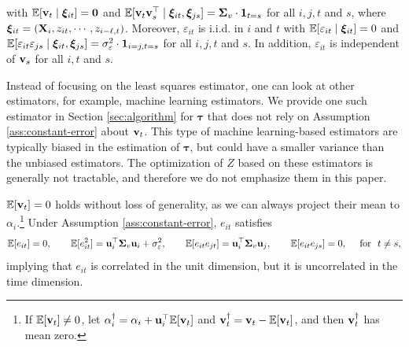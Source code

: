 	
	\begin{assumption}\label{ass:constant-error}
 with  $\mathbb{E}[\mathbf{v}_t  \mid \bm{\xi}_{it}] = \bm{0}$ and $\mathbb{E}[\mathbf{v}_t \mathbf{v}_s^\top \mid \bm{\xi}_{it}, \bm{\xi}_{js} ] = \bm\Sigma_{v} \cdot \bm{1}_{t = s}$ for all $i, j, t$ and $s$, where $\bm{\xi}_{it} = (\mathbf{X}_i, z_{it}, \cdots, z_{i-\ell, t})$. Moreover, $\varepsilon_{it} $ is i.i.d. in $i$ and $t$ with $\mathbb{E}[\varepsilon_{it} \mid \bm{\xi}_{it}] =0$ and $\mathbb{E}[\varepsilon_{it} \varepsilon_{js}  \mid \bm{\xi}_{it}, \bm{\xi}_{js} ] = \sigma_\varepsilon^2 \cdot \bm{1}_{i = j, t = s}$ for all $i, j, t$ and $s$. In addition, $\varepsilon_{it}$ is independent of $\mathbf{v}_s$  for all $i, t$ and $s$.
	\end{assumption}

	
	\begin{remark}
	    Instead of focusing on the least squares estimator, one can look at other estimators, for example, machine learning estimators.
	    We provide one such estimator in Section \ref{sec:algorithm} for $\bm{\tau}$ that does not rely on Assumption \ref{ass:constant-error} about $\mathbf{v}_t$. This type of machine learning-based estimators are typically biased in the estimation of $\bm{\tau}$, but could have a smaller variance than the unbiased estimators. The optimization of $Z$ based on these estimators is generally not tractable, and therefore we do not emphasize them in this paper.
	\end{remark}
	
	
		\begin{remark}
	$\mathbb{E}[\mathbf{v}_t] = 0$ holds without loss of generality, as we can always project their mean to $\alpha_i$.\footnote{If $\mathbb{E}[\mathbf{v}_t] \neq 0$, let $\alpha^\dagger_i = \alpha_i + \mathbf{u}_i^\top \mathbb{E}[\mathbf{v}_t] $ and $\mathbf{v}^\dagger_t = \mathbf{v}_t - \mathbb{E}[\mathbf{v}_t]$, and then $\mathbf{v}^\dagger_t $ has mean zero. } 
	Under Assumption \ref{ass:constant-error}, $e_{it}$ satisfies 
	\[\mathbb{E}[e_{it}] = 0, \qquad \mathbb{E}[e_{it}^2] = \mathbf{u}_i^\top \mathbf{\Sigma}_{v} \mathbf{u}_i + \sigma_{\varepsilon}^2, \qquad \mathbb{E}[e_{it} e_{jt}] = \mathbf{u}_i^\top \mathbf{\Sigma}_{v} \mathbf{u}_j, \qquad \mathbb{E}[e_{it}e_{js}] = 0, \quad \text{ for } \,\, t \neq s, \]
	implying that $e_{it}$ is correlated in the unit dimension, but it is uncorrelated in the time dimension.
	\end{remark}
%
 
